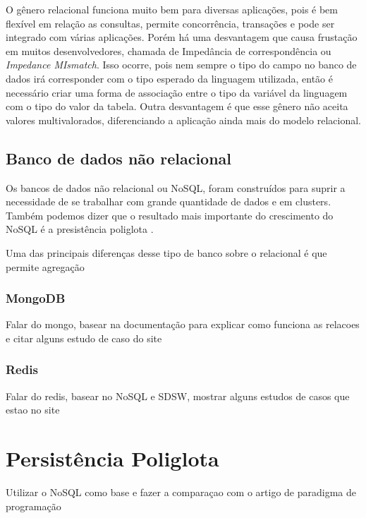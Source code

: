 O gênero relacional funciona muito bem para diversas aplicações, pois é bem flexível em relação as consultas, permite concorrência, transações e pode ser integrado com várias aplicações. Porém há uma desvantagem que causa frustação em muitos desenvolvedores, chamada de Impedância de correspondência ou \textit{Impedance MIsmatch}. Isso ocorre, pois nem sempre o tipo do campo no banco de dados irá corresponder com o tipo esperado da linguagem utilizada, então é necessário criar uma forma de associação entre o tipo da variável da linguagem com o tipo do valor da tabela. Outra desvantagem é que esse gênero não aceita valores multivalorados, diferenciando a aplicação ainda mais do modelo relacional.


\subsection{Banco de dados não relacional}
\label{subsec:nosqldatabasetype}
Os bancos de dados não relacional ou NoSQL, foram construídos para suprir a necessidade de se trabalhar com grande quantidade de dados e em clusters. Também podemos dizer que o resultado mais importante do crescimento do NoSQL é a presistência poliglota \cite{NoSQL}.

Uma das principais diferenças desse tipo de banco sobre o relacional é que permite agregação

\subsubsection{MongoDB}
\label{subsubsec:mongodatabasetype}

Falar do mongo, basear na documentação para explicar como funciona as relacoes e citar alguns estudo de caso do site


\subsubsection{Redis}
\label{subsubsec:redisdatabasetype}

Falar do redis, basear no NoSQL e SDSW, mostrar alguns estudos de casos que estao no site



\section{Persistência Poliglota}
\label{sec:polyglotpersitence}
Utilizar o NoSQL como base e fazer a comparaçao com o artigo de paradigma de programação


